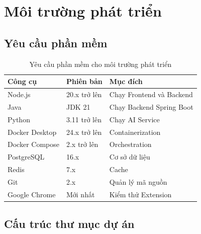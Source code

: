 \documentclass[12pt,a4paper]{report}
\begin{document}
\section{Môi trường phát triển}

\subsection{Yêu cầu phần mềm}

\begin{table}[H]
\centering
\caption{Yêu cầu phần mềm cho môi trường phát triển}
\begin{tabular}{|p{4cm}|p{4cm}|p{6cm}|}
\hline
\textbf{Công cụ} & \textbf{Phiên bản} & \textbf{Mục đích} \\
\hline
Node.js & 20.x trở lên & Chạy Frontend và Backend \\
\hline
Java & JDK 21 & Chạy Backend Spring Boot \\
\hline
Python & 3.11 trở lên & Chạy AI Service \\
\hline
Docker Desktop & 24.x trở lên & Containerization \\
\hline
Docker Compose & 2.x trở lên & Orchestration \\
\hline
PostgreSQL & 16.x & Cơ sở dữ liệu \\
\hline
Redis & 7.x & Cache \\
\hline
Git & 2.x & Quản lý mã nguồn \\
\hline
Google Chrome & Mới nhất & Kiểm thử Extension \\
\hline
\end{tabular}
\label{tab:dev_requirements}
\end{table}

\subsection{Cấu trúc thư mục dự án}
\end{document}
